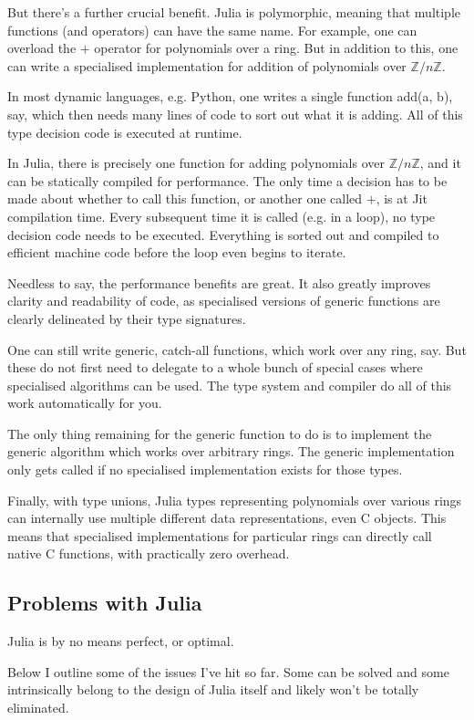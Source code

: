 \documentclass[a4paper,10pt]{article}
\newcommand{\Z}{\mathbb{Z}}
\begin{document}
But there's a further crucial benefit. Julia is polymorphic, meaning that multiple functions
(and operators) can have the same name. For example, one can overload the $+$ operator
for polynomials over a ring. But in addition to this, one can write a specialised 
implementation for addition of polynomials over $\Z/n\Z$.

In most dynamic languages, e.g. Python, one writes a single function add(a, b), say, which
then needs many lines of code to sort out what it is adding. All of this type decision code
is executed at runtime. 

In Julia, there is precisely one function for adding polynomials over $\Z/n\Z$, and it can
be statically compiled for performance. The only time a decision has to be made about whether
to call this function, or another one called $+$, is at Jit compilation time. Every subsequent
time it is called (e.g. in a loop), no type decision code needs to be executed. Everything
is sorted out and compiled to efficient machine code before the loop even begins to iterate.

Needless to say, the performance benefits are great. It also greatly improves clarity
and readability of code, as specialised versions of generic functions are clearly
delineated by their type signatures.

One can still write generic, catch-all functions, which work over any ring, say. But
these do not first need to delegate to a whole bunch of special cases where specialised
algorithms can be used. The type system and compiler do all of this work automatically 
for you.

The only thing remaining for the generic function to do is to implement the generic
algorithm which works over arbitrary rings. The generic implementation only gets
called if no specialised implementation exists for those types.

Finally, with type unions, Julia types representing polynomials over various rings can
internally use multiple different data representations, even C objects. This means that
specialised implementations for particular rings can directly call native C functions,
with practically zero overhead.

\subsection{Problems with Julia}

Julia is by no means perfect, or optimal.

Below I outline some of the issues I've hit so far. Some can be solved and some intrinsically
belong to the design of Julia itself and likely won't be totally eliminated.
\end{document}
